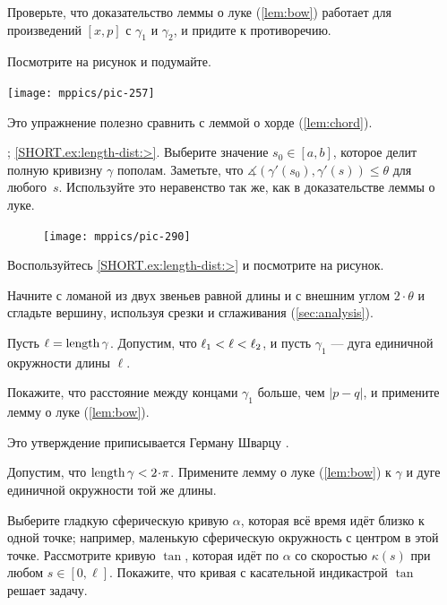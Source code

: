 \begin{multicols}{2}
Проверьте, что доказательство леммы о луке (\ref{lem:bow}) работает для произведений $[x,p]$ с $\gamma_1$ и $\gamma_2$, и придите к противоречию.

Посмотрите на рисунок и подумайте.

\begin{Figure}
\vskip-0mm
\centering
\texttt{[image: mppics/pic-257]}
\vskip0mm
\end{Figure}

Это упражнение полезно сравнить с леммой о хорде (\ref{lem:chord}).

\parbf{\ref{ex:length-dist}}; \ref{SHORT.ex:length-dist:>}.
Выберите значение $s_0\in[a,b]$, которое делит полную кривизну $\gamma$ пополам.
Заметьте, что $\measuredangle(\gamma'(s_0),\gamma'(s))\le \theta$ для любого~$s$.
Используйте это неравенство так же, как в доказательстве леммы о луке.

\begin{figure}
\vskip-5mm
\centering
\texttt{[image: mppics/pic-290]}
\vskip-0mm
\end{figure}

Воспользуйтесь \ref{SHORT.ex:length-dist:>} и посмотрите на рисунок.


Начните с ломаной из двух звеньев равной длины и с внешним углом $2\cdot\theta$ и сгладьте вершину, используя срезки и сглаживания (\ref{sec:analysis}).

Пусть $\ell=\mathop{\rm length}\nolimits\gamma$.
Допустим, что $\ell_1\z<\ell<\ell_2$, и пусть $\gamma_1$ --- дуга единичной окружности длины $\ell$.

Покажите, что расстояние между концами $\gamma_1$ больше, чем $|p-q|$, и примените лемму о луке (\ref{lem:bow}).

 Это утверждение приписывается Герману Шварцу \cite{shur}.

Допустим, что $\length\gamma<2\cdot\pi$. 
Примените лемму о луке (\ref{lem:bow}) к $\gamma$ и дуге единичной окружности той же длины.

Выберите гладкую сферическую кривую $\alpha$, которая всё время идёт близко к одной точке;
например, маленькую сферическую окружность с центром в этой точке.
Рассмотрите кривую $\tan$, которая идёт по $\alpha$ со скоростью $\kappa(s)$ при любом $s\in [0,\ell]$.
Покажите, что кривая с касательной индикастрой $\tan$ решает задачу.


\end{multicols}
